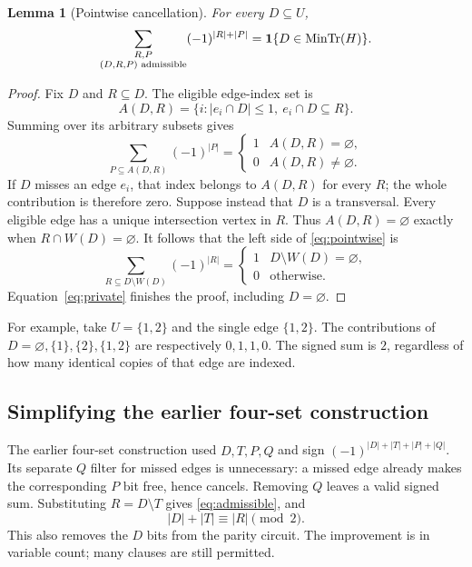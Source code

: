 \documentclass[11pt]{article}
\newtheorem{lemma}[theorem]{Lemma}
\theoremstyle{remark}\newtheorem{remark}[theorem]{Remark}
\newcommand{\MT}{\mathop{\rm MinTr}}
\newcommand{\ind}[1]{\mathbf 1\{#1\}}
\newcommand{\eps}{\varnothing}
\begin{document}
\begin{lemma}[Pointwise cancellation]\label{lem:pointwise}
For every $D\subseteq U$,
\begin{equation}\label{eq:pointwise}
 \sum_{\substack{R,P\\(D,R,P)\text{ admissible}}}
 (-1)^{|R|+|P|}=\ind{D\in\MT(H)}.
\end{equation}
\end{lemma}
\begin{proof}
Fix $D$ and $R\subseteq D$. The eligible edge-index set is
\[
 A(D,R)=\{i:|e_i\cap D|\le1,\ e_i\cap D\subseteq R\}.
\]
Summing over its arbitrary subsets gives
\[
 \sum_{P\subseteq A(D,R)}(-1)^{|P|}
 =\begin{cases}1&A(D,R)=\eps,\\0&A(D,R)\ne\eps.\end{cases}
\]
If $D$ misses an edge $e_i$, that index belongs to $A(D,R)$ for every $R$;
the whole contribution is therefore zero. Suppose instead that $D$ is a
transversal. Every eligible edge has a unique intersection vertex in $R$.
Thus $A(D,R)=\eps$ exactly when $R\cap W(D)=\eps$. It follows that the left
side of \eqref{eq:pointwise} is
\[
 \sum_{R\subseteq D\setminus W(D)}(-1)^{|R|}
 =\begin{cases}1&D\setminus W(D)=\eps,\\0&\text{otherwise}.\end{cases}
\]
Equation~\eqref{eq:private} finishes the proof, including $D=\eps$.
\end{proof}

For example, take $U=\{1,2\}$ and the single edge $\{1,2\}$. The contributions
of $D=\eps,\{1\},\{2\},\{1,2\}$ are respectively $0,1,1,0$. The signed sum
is $2$, regardless of how many identical copies of that edge are indexed.

\subsection{Simplifying the earlier four-set construction}
The earlier four-set construction used $D,T,P,Q$ and sign
$(-1)^{|D|+|T|+|P|+|Q|}$. Its separate $Q$ filter for missed edges is unnecessary:
a missed edge already makes the corresponding $P$ bit free, hence cancels.
Removing $Q$ leaves a valid signed sum. Substituting $R=D\setminus T$ gives
\eqref{eq:admissible}, and
\[
 |D|+|T|\equiv |R|\pmod2.
\]
This also removes the $D$ bits from the parity circuit. The improvement is in
variable count; many clauses are still permitted.
\end{document}
